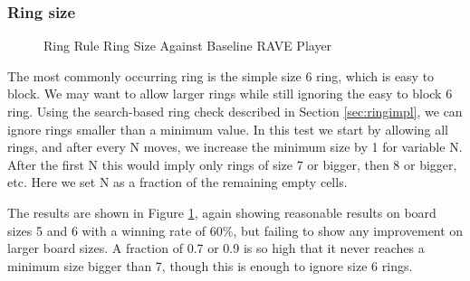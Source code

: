 \subsubsection{Ring size}

\begin{figure}
	\centering
{}
	\caption{Ring Rule Ring Size Against Baseline RAVE Player}
	\label{fig:ringsize}
\end{figure}

The most commonly occurring ring  is the simple size 6 ring, which is easy to block. We may want to allow larger rings while still ignoring the easy to block 6 ring. Using the search-based ring check described in Section \ref{sec:ringimpl}, we can ignore rings smaller than a minimum value. In this test we start by allowing all rings, and after every N moves, we increase the minimum size by 1 for variable N. After the first N this would imply only rings of size 7 or bigger, then 8 or bigger, etc. Here we set N as a fraction of the remaining empty cells.

The results are shown in Figure \ref{fig:ringsize}, again showing reasonable results on board sizes 5 and 6 with a winning rate of 60\%, but failing to show any improvement on larger board sizes. A fraction of 0.7 or 0.9 is so high that it never reaches a minimum size bigger than 7, though this is enough to ignore size 6 rings.



